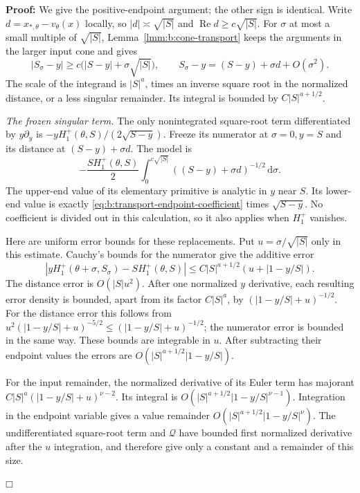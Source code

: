\documentclass[a4paper,10pt]{article}
\numberwithin{equation}{section}
\newcommand{\dd}{\mathrm{d}}
\theoremstyle{paperplain}
\theoremstyle{paperremark}
\theoremstyle{paperplain}
\newenvironment{prf}{\noindent \textbf{Proof: }}{\hfill $\mdlgwhtsquare$\par\addvspace{0.5\baselineskip}}
\begin{document}
\begin{prf}
We give the positive-endpoint argument; the other sign is identical.
Write $d=x_{*,\theta}-v_\theta(x)$ locally, so
$|d|\asymp\sqrt{|S|}$ and $\operatorname{Re}d\geq c\sqrt{|S|}$.
For $\sigma$ at most a small multiple of $\sqrt{|S|}$,
Lemma~\ref{lmm:b:cone-transport} keeps the arguments in the larger
input cone and gives
\[
 |S_\sigma-y|\geq c\bigl(|S-y|+\sigma\sqrt{|S|}\bigr),
 \qquad S_\sigma-y=(S-y)+\sigma d+O(\sigma^2).
\]
The scale of the integrand is $|S|^a$, times an inverse square root
in the normalized distance, or a less singular remainder.
Its integral is bounded by $C|S|^{a+1/2}$.

\smallskip\noindent
\emph{The frozen singular term.}
The only nonintegrated square-root term differentiated by
$y\partial_y$ is $-yH_1^+(\theta,S)/(2\sqrt{S-y})$.
Freeze its numerator at $\sigma=0,y=S$ and its distance at
$(S-y)+\sigma d$. The model is
\begin{equation}\label{eq:b:frozen-model}
 -\frac{S H_1^+(\theta,S)}2
       \int_0^{c\sqrt{|S|}}
                  ((S-y)+\sigma d)^{-1/2}\,\dd\sigma.
\end{equation}
The upper-end value of its elementary primitive is analytic in $y$
near $S$. Its lower-end value is exactly
\eqref{eq:b:transport-endpoint-coefficient} times $\sqrt{S-y}$.
No coefficient is divided out in this calculation, so it also applies
when $H_1^+$ vanishes.

Here are uniform error bounds for these replacements. Put
$u=\sigma/\sqrt{|S|}$ only in this estimate. Cauchy's bounds for
the numerator give the additive error
\[
 |yH_1^+(\theta+\sigma,S_\sigma)-S H_1^+(\theta,S)|
       \leq C|S|^{a+1/2}(u+|1-y/S|).
\]
The distance error is $O(|S|u^2)$. After one normalized
$y$ derivative, each resulting error density is bounded, apart
from its factor $C|S|^a$, by
$(|1-y/S|+u)^{-1/2}$.
For the distance error this follows from
$u^2(|1-y/S|+u)^{-5/2}\leq(|1-y/S|+u)^{-1/2}$;
the numerator error is bounded in the same way.
These bounds are integrable in $u$. After subtracting their endpoint
values the errors are $O(|S|^{a+1/2}|1-y/S|)$.

For the input remainder, the normalized derivative of its Euler term
has majorant
$C|S|^a(|1-y/S|+u)^{\nu-2}$.
Its integral is $O(|S|^{a+1/2}|1-y/S|^{\nu-1})$.
Integration in the endpoint variable gives a value remainder
$O(|S|^{a+1/2}|1-y/S|^\nu)$.
The undifferentiated square-root term and $\mathcal Q$ have bounded
first normalized derivative after the $u$ integration, and therefore
give only a constant and a remainder of this size.


\end{prf}
\end{document}
